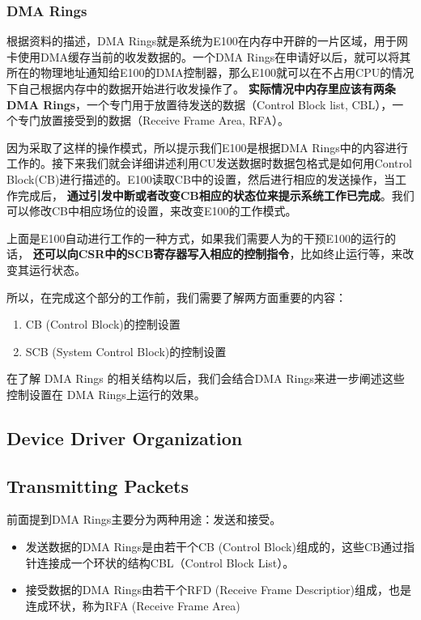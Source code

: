 \documentclass{article}
\newcommand{\highlight}[1]{{\bfseries \color{red}  #1}}
\begin{document}
\begin{CJK*}{UTF8}{gkai}
\subsubsection{DMA Rings}

根据资料的描述，DMA Rings就是系统为E100在内存中开辟的一片区域，用于网卡使用DMA缓存当前的收发数据的。一个DMA Rings在申请好以后，就可以将其所在的物理地址通知给E100的DMA控制器，那么E100就可以在不占用CPU的情况下自己根据内存中的数据开始进行收发操作了。\highlight{实际情况中内存里应该有两条DMA Rings}，一个专门用于放置待发送的数据（Control Block list, CBL），一个专门放置接受到的数据（Receive Frame Area, RFA）。

因为采取了这样的操作模式，所以提示我们E100是根据DMA Rings中的内容进行工作的。接下来我们就会详细讲述利用CU发送数据时数据包格式是如何用Control Block(CB)进行描述的。E100读取CB中的设置，然后进行相应的发送操作，当工作完成后，\highlight{通过引发中断或者改变CB相应的状态位来提示系统工作已完成}。我们可以修改CB中相应场位的设置，来改变E100的工作模式。

上面是E100自动进行工作的一种方式，如果我们需要人为的干预E100的运行的话，\highlight{还可以向CSR中的SCB寄存器写入相应的控制指令}，比如终止运行等，来改变其运行状态。

所以，在完成这个部分的工作前，我们需要了解两方面重要的内容：

\begin{enumerate}
\item{CB (Control Block)的控制设置}
\item{SCB (System Control Block)的控制设置}
\end{enumerate}

在了解 DMA Rings 的相关结构以后，我们会结合DMA Rings来进一步阐述这些控制设置在 DMA Rings上运行的效果。

\subsection{Device Driver Organization}


\subsection{Transmitting Packets}

前面提到DMA Rings主要分为两种用途：发送和接受。
\begin{itemize}

\item{发送数据的DMA Rings是由若干个CB (Control Block)组成的，这些CB通过指针连接成一个环状的结构CBL（Control Block List）。}
\item{接受数据的DMA Rings由若干个RFD (Receive Frame Descriptior)组成，也是连成环状，称为RFA (Receive Frame Area)}
\end{itemize}


\end{CJK*}
\end{document}
